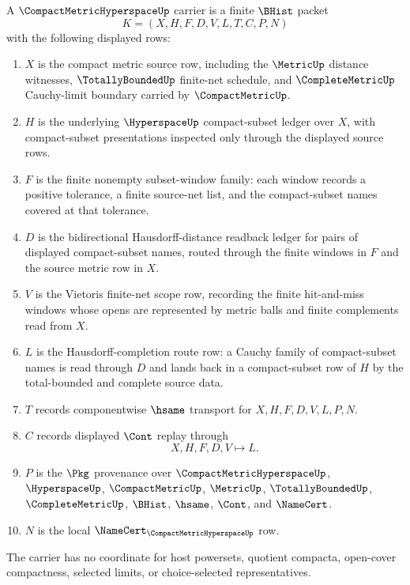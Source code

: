 \begin{definition}
\label{def:compact-metric-hyperspace-carrier}
A $\CompactMetricHyperspaceUp$ carrier is a finite $\BHist$ packet
$$
K=(X,H,F,D,V,L,T,C,P,N)
$$
with the following displayed rows:
\begin{enumerate}
\item $X$ is the compact metric source row, including the $\MetricUp$ distance witnesses, $\TotallyBoundedUp$ finite-net schedule, and $\CompleteMetricUp$ Cauchy-limit boundary carried by $\CompactMetricUp$.
\item $H$ is the underlying $\HyperspaceUp$ compact-subset ledger over $X$, with compact-subset presentations inspected only through the displayed source rows.
\item $F$ is the finite nonempty subset-window family: each window records a positive tolerance, a finite source-net list, and the compact-subset names covered at that tolerance.
\item $D$ is the bidirectional Hausdorff-distance readback ledger for pairs of displayed compact-subset names, routed through the finite windows in $F$ and the source metric row in $X$.
\item $V$ is the Vietoris finite-net scope row, recording the finite hit-and-miss windows whose opens are represented by metric balls and finite complements read from $X$.
\item $L$ is the Hausdorff-completion route row: a Cauchy family of compact-subset names is read through $D$ and lands back in a compact-subset row of $H$ by the total-bounded and complete source data.
\item $T$ records componentwise $\hsame$ transport for $X,H,F,D,V,L,P,N$.
\item $C$ records displayed $\Cont$ replay through
$$
X,H,F,D,V \longmapsto L .
$$
\item $P$ is the $\Pkg$ provenance over $\CompactMetricHyperspaceUp$, $\HyperspaceUp$, $\CompactMetricUp$, $\MetricUp$, $\TotallyBoundedUp$, $\CompleteMetricUp$, $\BHist$, $\hsame$, $\Cont$, and $\NameCert$.
\item $N$ is the local $\NameCert_{\CompactMetricHyperspaceUp}$ row.
\end{enumerate}
The carrier has no coordinate for host powersets, quotient compacta, open-cover compactness, selected limits, or choice-selected representatives.
\end{definition}

